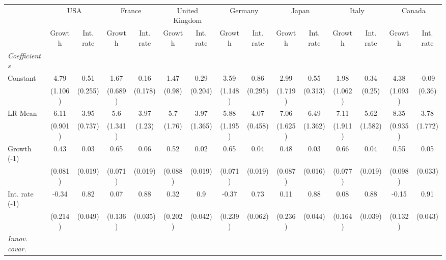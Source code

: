 \begin{table}[htbp] 
	\centering
	 \scriptsize
	\begin{tabular}{@{\extracolsep{4pt}}lcccccccccccccc@{}}		\hline\hline
		 		 & \multicolumn{2}{c}{USA} &\multicolumn{2}{c}{France} &\multicolumn{2}{c}{United Kingdom} &\multicolumn{2}{c}{Germany} &\multicolumn{2}{c}{Japan} &\multicolumn{2}{c}{Italy} &\multicolumn{2}{c}{Canada} \\ 
 		 & Growth 	 & Int. rate 	 & Growth 	 & Int. rate 	 & Growth 	 & Int. rate 	 & Growth 	 & Int. rate 	 & Growth 	 & Int. rate 	 & Growth 	 & Int. rate 	 & Growth 	 & Int. rate\\\cline{2-3}\cline{4-5}\cline{6-7}\cline{8-9}\cline{10-11}\cline{12-13}\cline{14-15}
\rule{0pt}{4ex} 
 \emph{Coefficients} 	  		 & 		 & 		 & 		 & 		 & 		 & 		 & 		 & 		 & 		 & 		 & 		 & 		 & 		 &\\ 
\quad Constant 	 & 4.79 	 & 0.51 	 & 1.67 	 & 0.16 	 & 1.47 	 & 0.29 	 & 3.59 	 & 0.86 	 & 2.99 	 & 0.55 	 & 1.98 	 & 0.34 	 & 4.38 	 & -0.09	 \\ 
 		 & (1.106) 	 & (0.255) 	 & (0.689) 	 & (0.178) 	 & (0.98) 	 & (0.204) 	 & (1.148) 	 & (0.295) 	 & (1.719) 	 & (0.313) 	 & (1.062) 	 & (0.25) 	 & (1.093) 	 & (0.36) 	 \\ 
\quad LR Mean 	 & 6.11 	 & 3.95 	 & 5.6 	 & 3.97 	 & 5.7 	 & 3.97 	 & 5.88 	 & 4.07 	 & 7.06 	 & 6.49 	 & 7.11 	 & 5.62 	 & 8.35 	 & 3.78	 \\ 
 		 & (0.901) 	 & (0.737) 	 & (1.341) 	 & (1.23) 	 & (1.76) 	 & (1.365) 	 & (1.195) 	 & (0.458) 	 & (1.625) 	 & (1.362) 	 & (1.911) 	 & (1.582) 	 & (0.935) 	 & (1.772) 	 \\ 
\quad Growth (-1) 	 &0.43 	 & 0.03 	 & 0.65 	 & 0.06 	 & 0.52 	 & 0.02 	 & 0.65 	 & 0.04 	 & 0.48 	 & 0.03 	 & 0.66 	 & 0.04 	 & 0.55 	 & 0.05	 \\ 
 		 & (0.081) 	 & (0.019) 	 & (0.071) 	 & (0.019) 	 & (0.088) 	 & (0.019) 	 & (0.071) 	 & (0.019) 	 & (0.087) 	 & (0.016) 	 & (0.077) 	 & (0.019) 	 & (0.098) 	 & (0.033) 	 \\ 
\quad Int. rate (-1) 	 &-0.34 	 & 0.82 	 & 0.07 	 & 0.88 	 & 0.32 	 & 0.9 	 & -0.37 	 & 0.73 	 & 0.11 	 & 0.88 	 & 0.08 	 & 0.88 	 & -0.15 	 & 0.91	 \\ 
 		 & (0.214) 	 & (0.049) 	 & (0.136) 	 & (0.035) 	 & (0.202) 	 & (0.042) 	 & (0.239) 	 & (0.062) 	 & (0.236) 	 & (0.044) 	 & (0.164) 	 & (0.039) 	 & (0.132) 	 & (0.043) 	 \\ 
\rule{0pt}{4ex} \emph{Innov. covar.}  	 & 	 & 	 & 	 & 	 & 	 & 	 & 	 & 	 & 	 & 	 & 	 & 	 & 	 &\\ 

\end{tabular}
\end{table}
